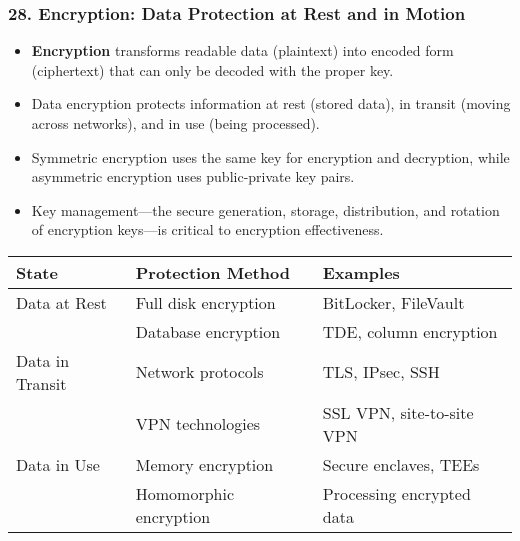 \documentclass{beamer}
\begin{document}
		\begin{frame}
			\frametitle{28. Encryption: Data Protection at Rest and in Motion}
			\begin{itemize}
				\item \textbf{Encryption} transforms readable data (plaintext) into encoded form (ciphertext) that can only be decoded with the proper key.
				\item Data encryption protects information at rest (stored data), in transit (moving across networks), and in use (being processed).
				\item Symmetric encryption uses the same key for encryption and decryption, while asymmetric encryption uses public-private key pairs.
				\item Key management—the secure generation, storage, distribution, and rotation of encryption keys—is critical to encryption effectiveness.
			\end{itemize}
			
			\begin{table}
				\scriptsize
				\begin{tabular}{|l|l|l|}
					\hline
					\textbf{State} & \textbf{Protection Method} & \textbf{Examples} \\
					\hline
					Data at Rest & Full disk encryption & BitLocker, FileVault \\
					\cline{2-3}
					& Database encryption & TDE, column encryption \\
					\hline
					Data in Transit & Network protocols & TLS, IPsec, SSH \\
					\cline{2-3}
					& VPN technologies & SSL VPN, site-to-site VPN \\
					\hline
					Data in Use & Memory encryption & Secure enclaves, TEEs \\
					\cline{2-3}
					& Homomorphic encryption & Processing encrypted data \\
					\hline
				\end{tabular}
			\end{table}
		\end{frame}
		
\end{document}
